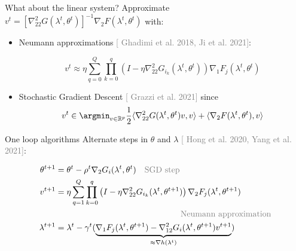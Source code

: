 \documentclass{beamer}
\newcommand{\citeline}[1]{\textcolor{gray}{\small[{\color{linkcolor} #1}]}}
\begin{document}
\begin{frame}{What about the linear system?}
    Approximate $v^t = \left[\nabla^2_{22} G(\lambda^t, \theta^t)\right]^{-1}\nabla_2 F(\lambda^t, \theta^t)$ with:

    \vspace{.5cm}
    \begin{itemize}[<+->]
        \item Neumann approximations \citeline{Ghadimi et al. 2018, Ji et al. 2021}:

        $$
        v^t
        \approx
        \eta\sum_{q=0}^{Q
        }
        \prod_{k=0}^q\left(I - \eta\nabla^2_{22}G_{i_k}(\lambda^t, \theta^t)\right)\nabla_1 F_j (\lambda^t, \theta^t)
        $$


        \vspace{.3cm}
        \item Stochastic Gradient Descent \citeline{Grazzi et al. 2021} since
        $$v^t \in \argmin_{v\in\mathbb R^p} \frac12\langle \nabla^2_{22} G(\lambda^t, \theta^t)v, v\rangle + \langle \nabla_2 F(\lambda^t, \theta^t), v\rangle$$
    \end{itemize}
\end{frame}


\begin{frame}{One loop algorithms}
    Alternate steps in $\theta$ and $\lambda$ \citeline{Hong et al. 2020, Yang et al. 2021}:

    \vspace{.3cm}
    \begin{align*}
        \theta^{t+1} &= \theta^t - \rho^t\nabla_2 G_i (\lambda^t, \theta^t)\quad\text{\textcolor{black!50}{SGD step}}\\
        v^{t+1} &= \eta\sum_{q=1}^Q\prod_{k=0}^q\left(I-\eta\nabla^2_{22} G_{i_k}(\lambda^t, \theta^{t+1})\right) \nabla_2 F_j(\lambda^t, \theta^{t+1})\\&\hskip15em\text{\textcolor{black!50}{Neumann approximation}}\\
        \lambda^{t+1} &= \lambda^t - \gamma^t(\underbrace{\nabla_1 F_j(\lambda^t, \theta^{t+1})-\nabla^2_{12}G_i(\lambda^t, \theta^{t+1})v^{t+1}}_{\approx \nabla h(\lambda^t)})
    \end{align*}
\end{frame}
\end{document}

